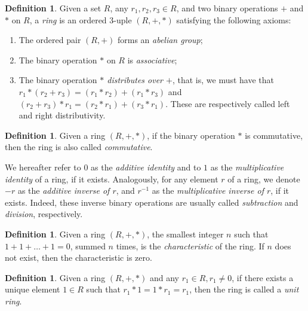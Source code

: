 \documentclass[draft, 12pt, a4paper, oneside]{memoir}
\theoremstyle{definition}
\newtheorem{definition}[theorem]{Definition}
\begin{document}
\begin{definition}
  Given a set $R$, any $r_{1}, r_{2}, r_{3} \in R$, and two binary operations $+$ and $\ast$ on $R$, a \emph{ring} is an ordered 3-uple $(R, +, \ast)$ satisfying the following axioms:
  
  \begin{enumerate}
    \item The ordered pair $(R, +)$ forms an \emph{abelian group};
    \item The binary operation $\ast$ on $R$ is \emph{associative};
    \item The binary operation \emph{$\ast$ distributes over $+$}, that is, we must have that $r_{1} \ast (r_{2} + r_{3}) = (r_{1} \ast r_{2}) + (r_{1} \ast r_{3})$ and $(r_{2} + r_{3}) \ast r_{1} = (r_{2} \ast r_{1}) + (r_{3} \ast r_{1})$. These are respectively called left and right distributivity.
  \end{enumerate}
\end{definition}

\begin{definition}
  Given a ring $(R, +, \ast)$, if the binary operation $\ast$ is commutative, then the ring is also called \emph{commutative}.
\end{definition}

We hereafter refer to $0$ as the \emph{additive identity} and to $1$ as the \emph{multiplicative identity} of a ring, if it exists. Analogously, for any element $r$ of a ring, we denote $-r$ as the \emph{additive inverse of $r$}, and $r^{-1}$ as the \emph{multiplicative inverse of $r$}, if it exists. Indeed, these inverse binary operations are usually called \emph{subtraction} and \emph{division}, respectively.

\begin{definition}
  Given a ring $(R, +, \ast)$, the smallest integer $n$ such that $1 + 1 + \dots + 1 = 0$, summed $n$ times, is the \emph{characteristic} of the ring. If $n$ does not exist, then the characteristic is zero.
\end{definition}

\begin{definition}
  Given a ring $(R, +, \ast)$ and any $r_{1} \in R, r_{1} \neq 0$, if there exists a unique element $1 \in R$ such that $r_{1} \ast 1 = 1 \ast r_{1} = r_{1}$, then the ring is called a \emph{unit ring}.
\end{definition}

\end{document}
